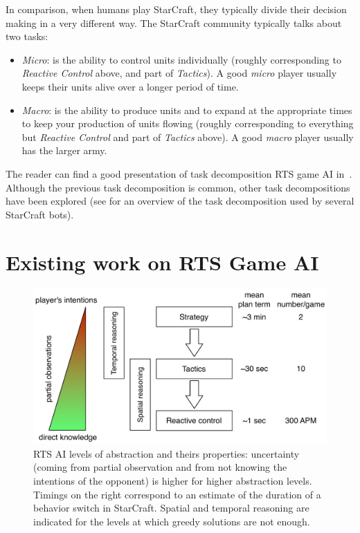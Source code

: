 \documentclass{llncs}
\begin{document}
In comparison, when humans play StarCraft, they typically divide their
decision  making in  a  very different  way.  The StarCraft  community
typically talks about two tasks:
\begin{itemize}
\item  {\em  Micro}: is  the  ability  to control  units  individually
  (roughly corresponding to {\em Reactive  Control} above, and part of
  {\em Tactics}). A good \emph{micro} player usually keeps their units
  alive over a longer period of time.
\item {\em  Macro}: is the ability  to produce units and  to expand at
  the  appropriate times  to  keep your  production  of units  flowing
  (roughly corresponding to everything  but {\em Reactive Control} and
  part of {\em Tactics} above). A good \emph{macro} player usually has
  the larger army.
\end{itemize}

The reader can find a good  presentation of task decomposition RTS game AI in~\cite{weber2011acs}.  Although  the   previous  task decomposition  is  common, other task decompositions have been explored (see \cite{ontanon2013survey} for an overview of the task decomposition used by several StarCraft bots).



\section{Existing work on RTS Game AI}\label{sec:review}

\begin{figure}
    \centering
    \includegraphics[width=0.7\columnwidth]{figures/levels_abstraction.pdf}
    \caption{RTS  AI  levels  of abstraction  and  theirs  properties:
      uncertainty  (coming  from  partial  observation  and  from  not
      knowing the  intentions of  the opponent)  is higher  for higher
      abstraction  levels.  Timings  on  the right  correspond  to  an
      estimate   of   the   duration   of   a   behavior   switch   in
      StarCraft. Spatial and temporal  reasoning are indicated for the
      levels at which greedy solutions are not enough.}
    \label{fig:levels-abstraction}
\end{figure}
\end{document}
